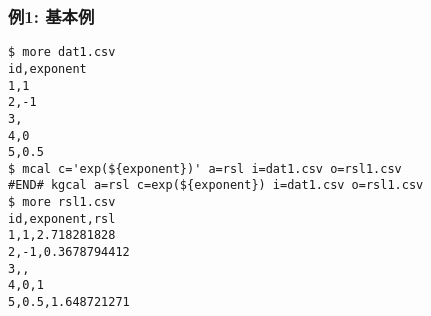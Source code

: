 \subsubsection*{例1: 基本例}



\begin{Verbatim}[baselinestretch=0.7,frame=single]
$ more dat1.csv
id,exponent
1,1
2,-1
3,
4,0
5,0.5
$ mcal c='exp(${exponent})' a=rsl i=dat1.csv o=rsl1.csv
#END# kgcal a=rsl c=exp(${exponent}) i=dat1.csv o=rsl1.csv
$ more rsl1.csv
id,exponent,rsl
1,1,2.718281828
2,-1,0.3678794412
3,,
4,0,1
5,0.5,1.648721271
\end{Verbatim}
